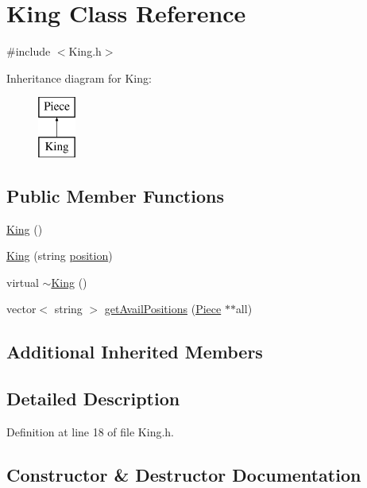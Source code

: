 \hypertarget{class_king}{}\section{King Class Reference}
\label{class_king}


{\ttfamily \#include $<$King.\+h$>$}

Inheritance diagram for King\+:\begin{figure}[H]
\begin{center}
\leavevmode
\includegraphics[height=2.000000cm]{class_king}
\end{center}
\end{figure}
\subsection*{Public Member Functions}
\begin{DoxyCompactItemize}
\item 
\hyperlink{class_king_ae374efc047c95212f78a49c877e34563}{King} ()
\item 
\hyperlink{class_king_a3bc5b94579c5895795a55f1ce7a796f4}{King} (string \hyperlink{class_piece_a1b93d0ecc14e15fc7f3fb5def518502a}{position})
\item 
virtual \hyperlink{class_king_aac368ce96e2b12f62e3608d27262e941}{$\sim$\+King} ()
\item 
vector$<$ string $>$ \hyperlink{class_king_aa4d67d5f446902213730ff76a6faab54}{get\+Avail\+Positions} (\hyperlink{class_piece}{Piece} $\ast$$\ast$all)
\end{DoxyCompactItemize}
\subsection*{Additional Inherited Members}


\subsection{Detailed Description}


Definition at line 18 of file King.\+h.



\subsection{Constructor \& Destructor Documentation}
